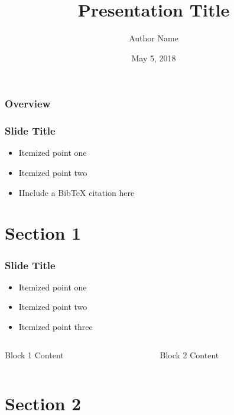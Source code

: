 \documentclass{beamer}
\title{Presentation Title}
\author{Author Name}
\institute{Organization Name}
\date{May 5, 2018}
\begin{document}
\begin{frame}
\titlepage
\end{frame}

\begin{frame}
\frametitle{Overview}
\tableofcontents
\end{frame}

\begin{frame}
\frametitle{Slide Title}

\begin{itemize}
\item Itemized point one
\item Itemized point two
\item IInclude a BibTeX citation here \cite{citation_name}
\end{itemize}
\end{frame}

\section{Section 1}

\begin{frame}
\frametitle{Slide Title}
\begin{itemize}
\item Itemized point one
\item Itemized point two
\item Itemized point three
\end{itemize}

\vspace{20pt}
\begin{columns}[T]
\begin{column}{.45\textwidth}
\begin{block}{Block 1}
Content
\end{block}
\end{column}
\hfill%
\begin{column}{.45\textwidth}
\begin{block}{Block 2}
Content
\end{block}
\end{column}
\end{columns}
\end{frame}



\section{Section 2}
\end{document}
